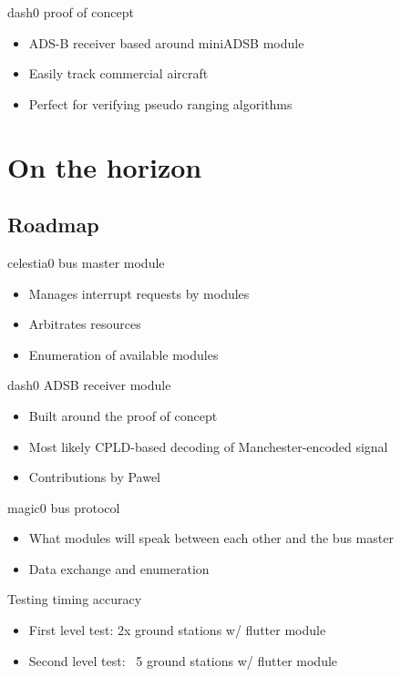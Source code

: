	\begin{frame}{dash0 proof of concept}
		\begin{itemize}
			\item ADS-B receiver based around miniADSB module
			\item Easily track commercial aircraft
			\item Perfect for verifying pseudo ranging algorithms
		\end{itemize}
	\end{frame}

\section{On the horizon}	

\subsection{Roadmap}
	\begin{frame}{celestia0 bus master module}
		\begin{itemize}
			\item Manages interrupt requests by modules
			\item Arbitrates resources
			\item Enumeration of available modules
		\end{itemize}
	\end{frame}
	\begin{frame}{dash0 ADSB receiver module}
		\begin{itemize}
			\item Built around the proof of concept
			\item Most likely CPLD-based decoding of Manchester-encoded signal
			\item Contributions by Pawel
		\end{itemize}
	\end{frame}
	\begin{frame}{magic0 bus protocol}
		\begin{itemize}
			\item What modules will speak between each other and the bus master
			\item Data exchange and enumeration
		\end{itemize}
	\end{frame}
	\begin{frame}{Testing timing accuracy}
		\begin{itemize}
			\item First level test: 2x ground stations w/ flutter module
			\item Second level test: ~5 ground stations w/ flutter module
		\end{itemize}
	\end{frame}
